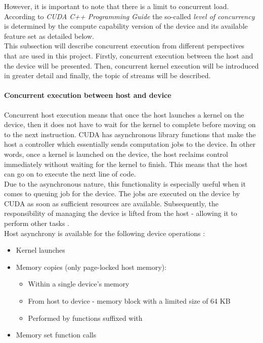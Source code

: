 However, it is important to note that there is a limit to concurrent load. According to \emph{CUDA C++ Programming Guide} \cite{NVIDIAMay2022} the so-called \textit{level of concurrency} is determined by the compute capability version of the device and its available feature set as detailed below. \\
This subsection will describe concurrent execution from different perspectives that are used in this project. Firstly, concurrent execution between the host and the device will be presented. Then, concurrent kernel execution will be introduced in greater detail and finally, the topic of streams will be described.
 
\paragraph{Concurrent execution between host and device}
Concurrent host execution means that once the host launches a kernel on the device, then it does not have to wait for the kernel to complete before moving on to the next instruction. CUDA has asynchronous library functions that make the host a controller which essentially sends computation jobs to the device. In other words, once a kernel is launched on the device, the host reclaims control immediately without waiting for the kernel to finish. This means that the host can go on to execute the next line of code. \\
Due to the asynchronous nature, this functionality is especially useful when it comes to queuing job for the device. The jobs are executed on the device by CUDA as soon as sufficient resources are available. Subsequently, the responsibility of managing the device is lifted from the host - allowing it to perform other tasks \cite{NVIDIAMay2022}. \\
Host asynchrony is available for the following device operations \cite{NVIDIAMay2022}:

\begin{itemize}
	\item Kernel launches
	\item Memory copies (only page-locked host memory):
	\begin{itemize}
		\item Within a single device's memory
		\item From host to device - memory block with a limited size of 64 KB
		\item Performed by functions suffixed with 
	\end{itemize}
	\item Memory set function calls
\end{itemize}

